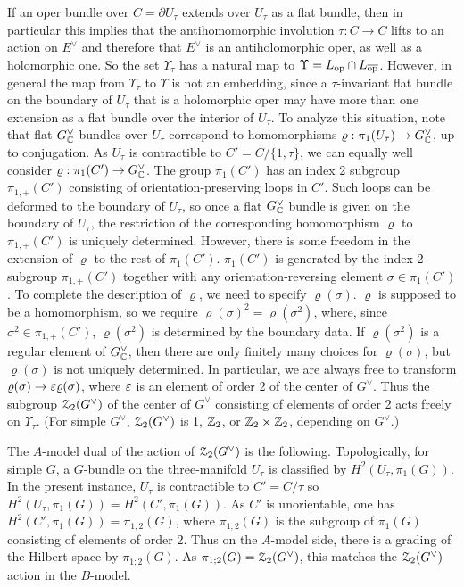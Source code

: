\documentclass[11pt,a4paper]{article}
\begin{document}
If an oper bundle over $C=\partial U_\tau$ extends over $U_\tau$ as a flat bundle, then in particular this
implies that  the antihomomorphic involution $\tau:C\to C$ lifts to an action on $E^\vee$
and therefore that $E^\vee$ is an antiholomorphic oper, as well as a holomorphic one.   So the set $\Upsilon_\tau$ 
 has a natural map to  $\Upsilon=L_{\mathrm{op}}\cap L_{\overline{\mathrm{op}}}$.    However, in general the map from $\Upsilon_\tau$
to $\Upsilon$ is not an embedding, since a $\tau$-invariant flat bundle on the boundary of $U_\tau$ that is a holomorphic oper may have more
than one extension as a flat bundle over the interior of $U_\tau$.   To analyze this situation, note that flat $G^\vee_{\mathbb C}$ bundles over $U_\tau$ correspond
to homomorphisms  $\varrho:\pi_1(U_\tau)\to G^\vee_{\mathbb C}$, up to conjugation.   As $U_\tau$ is contractible to $C'=C/\{1,\tau\}$, we can equally well
consider $\varrho:\pi_1(C')\to G^\vee_{\mathbb C}$.    The group $\pi_1(C')$ has an index 2  subgroup $\pi_{1,+}(C')$  consisting of orientation-preserving loops in $C'$.
Such loops can be deformed to the boundary of $U_\tau$, so once a flat $G^\vee_{\mathbb C}$ bundle is given on the boundary of $U_\tau$, the restriction of the corresponding
homomorphism $\varrho$ to $\pi_{1,+}(C')$ is uniquely determined.   However, there is some freedom in the extension of $\varrho$ to the rest of $\pi_1(C')$.
$\pi_1(C')$ is generated by the index 2 subgroup $\pi_{1,+}(C')$ together with any  orientation-reversing element $\sigma\in \pi_1(C')$.   To complete the description of
$\varrho$, we need to specify $\varrho(\sigma)$.     $\varrho$ is supposed to be a homomorphism, so we require $\varrho(\sigma)^2=\varrho(\sigma^2)$,
where, since $\sigma^2\in \pi_{1,+}(C')$, $\varrho(\sigma^2)$ is determined by the boundary data.    If $\varrho(\sigma^2)$ is a regular element of $G^\vee_{\mathbb C}$,
then there are only finitely many choices for $\varrho(\sigma)$, but  $\varrho(\sigma)$ is not uniquely determined.    In particular, we are always free
to transform $\varrho(\sigma)\to \varepsilon \varrho(\sigma)$, where $\varepsilon$ is an element of order 2 of the center of $G^\vee$.   Thus the subgroup
${\mathcal Z}_2(G^\vee)$ of the center of $G^\vee$ consisting of elements of order 2 acts freely on $\Upsilon_\tau$.  (For simple $G^\vee$, ${\mathcal Z}_2(G^\vee)$ is
1, ${\mathbb Z}_2$, or ${\mathbb Z}_2\times {\mathbb Z}_2$, depending on $G^\vee$.)    
 
 The $A$-model dual of the action of  ${\mathcal Z}_2(G^\vee)$  is the following.   Topologically, for simple $G$, a $G$-bundle on the three-manifold
 $U_\tau$ is classified by $H^2(U_\tau,\pi_1(G))$.   In the present instance, $U_\tau$ is contractible to $C'=C/\tau$ so $H^2(U_\tau,\pi_1(G))=H^2(C',\pi_1(G))$.
 As $C'$ is unorientable, one has $H^2(C',\pi_1(G))=\pi_{1;2}(G)$, where $\pi_{1;2}(G)$ is the subgroup of $\pi_1(G)$ consisting of elements of
 order 2.    Thus on the $A$-model side, there is a grading of the Hilbert space by $\pi_{1;2}(G)$.  As $\pi_{1;2}(G)={\mathcal Z}_2(G^\vee)$, this 
matches the ${\mathcal Z}_2(G^\vee)$ action in the $B$-model.   
 
\end{document}
